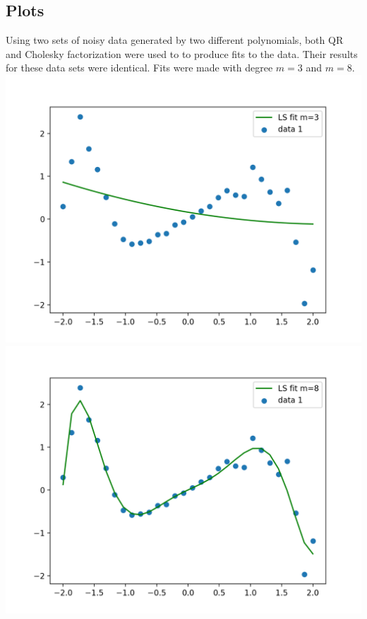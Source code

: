 \documentclass[11pt]{article}
\begin{document}
\begin{enumerate}
\section{Plots}
Using two sets of noisy data generated by two different polynomials, both QR and Cholesky factorization were used to to produce fits to the data. Their results for these data sets were identical. Fits were made with degree $m = 3$ and $m = 8$.\\
\includegraphics[scale=0.5]{data1_m3.png}
\includegraphics[scale=0.5]{data1_m8.png}\\

\end{enumerate}
\end{document}

